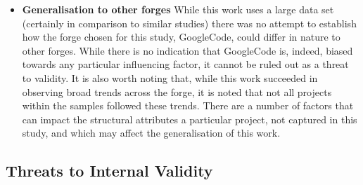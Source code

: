 \begin{itemize}
\item  \textbf{Generalisation to other forges} While this work uses a large data set (certainly in comparison to similar studies) there was no attempt to establish how the forge chosen for this study, GoogleCode, could differ in nature to other forges. While there is no indication that GoogleCode is, indeed, biased towards any particular influencing factor, it cannot be ruled out as a threat to validity. It is also worth noting that, while this work succeeded in observing broad trends across the forge, it is noted that not all projects within the samples followed these trends. There are a number of factors that can impact the structural attributes a particular project, not captured in this study, and which may affect the generalisation of this work.
\end{itemize}

\subsection{Threats to Internal Validity}

